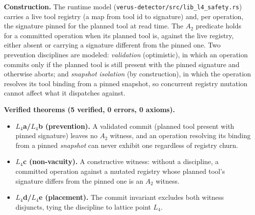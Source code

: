 \documentclass[journal,compsoc,10pt]{IEEEtran}
\theoremstyle{definition}
\theoremstyle{remark}
\begin{document}
\medskip
\noindent\textbf{Construction.}
The runtime model
(\texttt{verus-detector/src/lib\_l4\_safety.rs}) carries a live
tool registry (a map from tool id to signature) and, per
operation, the signature pinned for the planned tool at read
time. The $A_2$ predicate holds for a committed operation when
its planned tool is, against the live registry, either absent or
carrying a signature different from the pinned one. Two
prevention disciplines are modeled: \emph{validation}
(optimistic), in which an operation commits only if the planned
tool is still present with the pinned signature and otherwise
aborts; and \emph{snapshot isolation} (by construction), in
which the operation resolves its tool binding from a pinned
snapshot, so concurrent registry mutation cannot affect what it
dispatches against.

\medskip
\noindent\textbf{Verified theorems (5 verified, 0 errors, 0 axioms).}
\begin{itemize}
  \item \textbf{$L_4$a/$L_4$b (prevention).} A validated commit (planned
    tool present with pinned signature) leaves no $A_2$ witness, and an
    operation resolving its binding from a pinned \emph{snapshot} can never
    exhibit one regardless of registry churn.
  \item \textbf{$L_4$c (non-vacuity).} A constructive witness: without a
    discipline, a committed operation against a mutated registry whose
    planned tool's signature differs from the pinned one is an $A_2$ witness.
  \item \textbf{$L_4$d/$L_4$e (placement).} The commit invariant excludes
    both witness disjuncts, tying the discipline to lattice point $L_4$.
\end{itemize}
\end{document}

